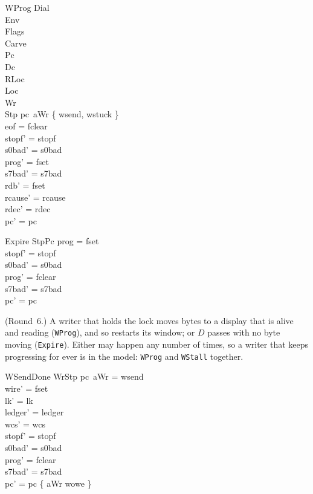\documentclass[a4paper,10pt,fleqn]{article}
\begin{document}
\begin{schema}{WProg}
  \Xi Dial \\ \Xi Env \\ \Xi Flags \\ \Xi Carve \\ \Delta Pc \\ \Xi Dc \\
  \Delta RLoc \\ \Xi Loc \\ \Xi Wr \\ \Delta Stp
\where
  pc~aWr \in \{ wsend, wstuck \} \\
  eof = fclear \\
  stopf' = stopf \\
  s0bad' = s0bad \\
  prog' = fset \\
  s7bad' = s7bad \\
  rdb' = fset \\
  rcause' = rcause \\
  rdec' = rdec \\
  pc' = pc
\end{schema}

\begin{schema}{Expire}
  StpPc
\where
  prog = fset \\
  stopf' = stopf \\
  s0bad' = s0bad \\
  prog' = fclear \\
  s7bad' = s7bad \\
  pc' = pc
\end{schema}

(Round~6.)  A writer that holds the lock moves bytes to a display that is
alive and reading (\texttt{WProg}), and so restarts its window; or $D$ passes
with no byte moving (\texttt{Expire}).  Either may happen any number of times, so
a writer that keeps progressing for ever is in the model: \texttt{WProg} and
\texttt{WStall} together.

\begin{schema}{WSendDone}
  WrStp
\where
  pc~aWr = wsend \\
  wire' = fset \\
  lk' = lk \\
  ledger' = ledger \\
  wcs' = wcs \\
  stopf' = stopf \\
  s0bad' = s0bad \\
  prog' = fclear \\
  s7bad' = s7bad \\
  pc' = pc \oplus \{ aWr \mapsto wowe \}
\end{schema}
\end{document}
